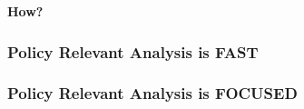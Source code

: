 \documentclass{beamer}
\begin{document}
\begin{frame}
\begin{center}
\Huge \textbf{How?}
\end{center}
\end{frame}

{
\begin{frame}[plain]
\frametitle{Policy Relevant Analysis is FAST}
\end{frame}
}

{
\begin{frame}[plain]
\frametitle{Policy Relevant Analysis is FOCUSED}
\end{frame}
}
\end{document}
